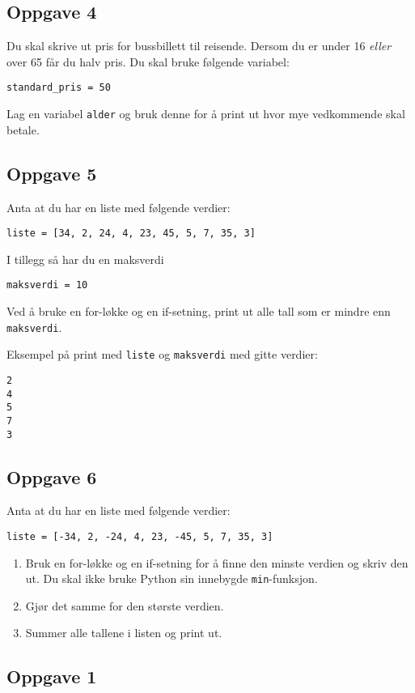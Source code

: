 \documentclass{article}
\begin{document}
\subsection*{Oppgave 4}
Du skal skrive ut pris for bussbillett til reisende. Dersom du er under 16 \textit{eller} over 65 får du halv pris. Du skal bruke følgende variabel:

\begin{verbatim}
standard_pris = 50
\end{verbatim}

Lag en variabel \texttt{alder} og bruk denne for å print ut hvor mye vedkommende skal betale.

\subsection*{Oppgave 5}
Anta at du har en liste med følgende verdier:

\begin{verbatim}
liste = [34, 2, 24, 4, 23, 45, 5, 7, 35, 3]
\end{verbatim}
I tillegg så har du en maksverdi
\begin{verbatim}
maksverdi = 10
\end{verbatim}

Ved å bruke en for-løkke og en if-setning, print ut alle tall som er mindre enn \texttt{maksverdi}.

Eksempel på print med \texttt{liste} og \texttt{maksverdi} med gitte verdier:
\begin{verbatim}
2
4
5
7
3
\end{verbatim}

\subsection*{Oppgave 6}
Anta at du har en liste med følgende verdier:

\begin{verbatim}
liste = [-34, 2, -24, 4, 23, -45, 5, 7, 35, 3]
\end{verbatim}

\begin{enumerate}
\item Bruk en for-løkke og en if-setning for å finne den minste verdien og skriv den ut. Du skal ikke bruke Python sin innebygde \texttt{min}-funksjon.
\item Gjør det samme for den største verdien.
\item Summer alle tallene i listen og print ut.
\end{enumerate}

\subsection*{Oppgave 1}
\end{document}
